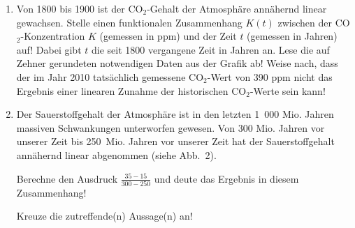 \begin{langesbeispiel}
\begin{enumerate}
	
		\item Von 1800 bis 1900 ist der CO$_2$-Gehalt der Atmosphäre annähernd linear gewachsen. Stelle einen funktionalen Zusammenhang $K(t)$ zwischen der CO$_2$-Konzentration $K$ (gemessen in ppm) und der Zeit $t$ (gemessen in Jahren) auf! Dabei gibt $t$ die seit 1800 vergangene Zeit in Jahren an. Lese die auf Zehner gerundeten notwendigen Daten aus der Grafik ab!  Weise nach, dass der im Jahr 2010 tatsächlich gemessene CO$_2$-Wert von 390 ppm nicht das Ergebnis einer linearen Zunahme der historischen CO$_2$-Werte sein kann!

	
		\item Der Sauerstoffgehalt der Atmosphäre ist in den letzten 1 000 Mio. Jahren massiven Schwankungen unterworfen gewesen. Von 300 Mio. Jahren vor unserer Zeit bis 250 Mio. Jahren vor unserer Zeit hat der Sauerstoffgehalt annähernd linear abgenommen (siehe Abb. 2).
		
		 Berechne den Ausdruck $\frac{35-15}{300-250}$ und deute das Ergebnis in diesem Zusammenhang!
		
		Kreuze die zutreffende(n) Aussage(n) an!
		

\end{enumerate}
\end{langesbeispiel}
